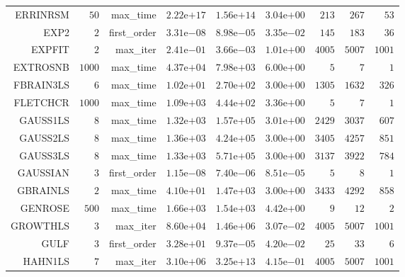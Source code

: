 \begin{longtable}{rrrrrrrrr}
ERRINRSM & \(    50\) & max\_time & \( 2.22\)e\(+17\) & \( 1.56\)e\(+14\) & \( 3.04\)e\(+00\) & \(   213\) & \(   267\) & \(    53\) \\
EXP2 & \(     2\) & first\_order & \( 3.31\)e\(-08\) & \( 8.98\)e\(-05\) & \( 3.35\)e\(-02\) & \(   145\) & \(   183\) & \(    36\) \\
EXPFIT & \(     2\) & max\_iter & \( 2.41\)e\(-01\) & \( 3.66\)e\(-03\) & \( 1.01\)e\(+00\) & \(  4005\) & \(  5007\) & \(  1001\) \\
EXTROSNB & \(  1000\) & max\_time & \( 4.37\)e\(+04\) & \( 7.98\)e\(+03\) & \( 6.00\)e\(+00\) & \(     5\) & \(     7\) & \(     1\) \\
FBRAIN3LS & \(     6\) & max\_time & \( 1.02\)e\(+01\) & \( 2.70\)e\(+02\) & \( 3.00\)e\(+00\) & \(  1305\) & \(  1632\) & \(   326\) \\
FLETCHCR & \(  1000\) & max\_time & \( 1.09\)e\(+03\) & \( 4.44\)e\(+02\) & \( 3.36\)e\(+00\) & \(     5\) & \(     7\) & \(     1\) \\
GAUSS1LS & \(     8\) & max\_time & \( 1.32\)e\(+03\) & \( 1.57\)e\(+05\) & \( 3.01\)e\(+00\) & \(  2429\) & \(  3037\) & \(   607\) \\
GAUSS2LS & \(     8\) & max\_time & \( 1.36\)e\(+03\) & \( 4.24\)e\(+05\) & \( 3.00\)e\(+00\) & \(  3405\) & \(  4257\) & \(   851\) \\
GAUSS3LS & \(     8\) & max\_time & \( 1.33\)e\(+03\) & \( 5.71\)e\(+05\) & \( 3.00\)e\(+00\) & \(  3137\) & \(  3922\) & \(   784\) \\
GAUSSIAN & \(     3\) & first\_order & \( 1.15\)e\(-08\) & \( 7.40\)e\(-06\) & \( 8.51\)e\(-05\) & \(     5\) & \(     8\) & \(     1\) \\
GBRAINLS & \(     2\) & max\_time & \( 4.10\)e\(+01\) & \( 1.47\)e\(+03\) & \( 3.00\)e\(+00\) & \(  3433\) & \(  4292\) & \(   858\) \\
GENROSE & \(   500\) & max\_time & \( 1.66\)e\(+03\) & \( 1.54\)e\(+03\) & \( 4.42\)e\(+00\) & \(     9\) & \(    12\) & \(     2\) \\
GROWTHLS & \(     3\) & max\_iter & \( 8.60\)e\(+04\) & \( 1.46\)e\(+06\) & \( 3.07\)e\(-02\) & \(  4005\) & \(  5007\) & \(  1001\) \\
GULF & \(     3\) & first\_order & \( 3.28\)e\(+01\) & \( 9.37\)e\(-05\) & \( 4.20\)e\(-02\) & \(    25\) & \(    33\) & \(     6\) \\
HAHN1LS & \(     7\) & max\_iter & \( 3.10\)e\(+06\) & \( 3.25\)e\(+13\) & \( 4.15\)e\(-01\) & \(  4005\) & \(  5007\) & \(  1001\) \\

\end{longtable}
